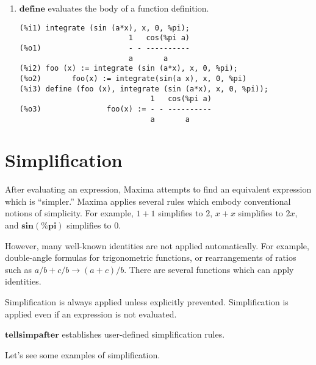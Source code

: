 \documentclass[12pt]{article}
\begin{document}
\begin{enumerate}
\item $\mathbf{define}$ evaluates the body of a function definition.

\begin{verbatim}
(%i1) integrate (sin (a*x), x, 0, %pi);
                         1   cos(%pi a)
(%o1)                    - - ----------
                         a       a
(%i2) foo (x) := integrate (sin (a*x), x, 0, %pi);
(%o2)       foo(x) := integrate(sin(a x), x, 0, %pi)
(%i3) define (foo (x), integrate (sin (a*x), x, 0, %pi));
                              1   cos(%pi a)
(%o3)               foo(x) := - - ----------
                              a       a
\end{verbatim}

\end{enumerate}

\section{Simplification}

After evaluating an expression,
Maxima attempts to find an equivalent expression which is ``simpler.''
Maxima applies several rules which embody conventional notions of simplicity.
For example,
$1 + 1$ simplifies to $2$, 
$x + x$ simplifies to $2 x$,
and $\mathbf{sin}(\mathbf{\%pi})$ simplifies to $0$.

However,
many well-known identities are not applied automatically.
For example,
double-angle formulas for trigonometric functions,
or rearrangements of ratios such as $a/b + c/b \rightarrow (a + c)/b$.
There are several functions which can apply identities.

Simplification is always applied unless explicitly prevented.
Simplification is applied even if an expression is not evaluated.

$\mathbf{tellsimpafter}$ establishes user-defined simplification rules.

Let's see some examples of simplification.
\end{document}
